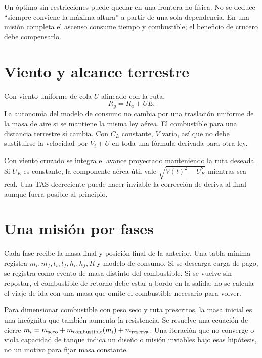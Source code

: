 Un óptimo sin restricciones puede quedar en una frontera no física. No se deduce ``siempre conviene la máxima altura'' a partir de una sola dependencia. En una misión completa el ascenso consume tiempo y combustible; el beneficio de crucero debe compensarlo.

\section{Viento y alcance terrestre}
Con viento uniforme de cola $U$ alineado con la ruta,
\begin{equation}
R_g=R_a+UE.
\end{equation}
La autonomía del modelo de consumo no cambia por una traslación uniforme de la masa de aire si se mantiene la misma ley aérea. El combustible para una distancia terrestre sí cambia. Con $C_L$ constante, $V$ varía, así que no debe sustituirse la velocidad por $V_i+U$ en toda una fórmula derivada para otra ley.

Con viento cruzado se integra el avance proyectado manteniendo la ruta deseada. Si $U_E$ es constante, la componente aérea útil vale $\sqrt{V(t)^2-U_E^2}$ mientras sea real. Una TAS decreciente puede hacer inviable la corrección de deriva al final aunque fuera posible al principio.

\section{Una misión por fases}
Cada fase recibe la masa final y posición final de la anterior. Una tabla mínima registra $m_i,m_f,t_i,t_f,h_i,h_f,R$ y modelo de consumo. Si se descarga carga de pago, se registra como evento de masa distinto del combustible. Si se vuelve sin repostar, el combustible de retorno debe estar a bordo en la salida; no se calcula el viaje de ida con una masa que omite el combustible necesario para volver.

Para dimensionar combustible con peso seco y ruta prescritos, la masa inicial es una incógnita que también aumenta la resistencia. Se resuelve una ecuación de cierre $m_i=m_{\rm seco}+m_{\rm combustible}(m_i)+m_{\rm reserva}$. Una iteración que no converge o viola capacidad de tanque indica un diseño o misión inviables bajo esas hipótesis, no un motivo para fijar masa constante.


